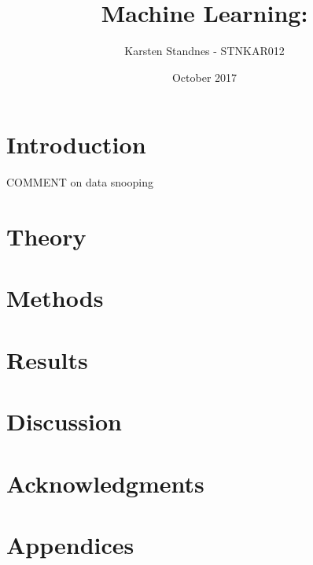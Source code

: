 \documentclass{article}
\title{Machine Learning:  }
\author{Karsten Standnes - STNKAR012}
\date{October 2017}
\begin{document}
	
	\maketitle
	\setlength\parindent{0pt}
	
	\section{Introduction}
	
	
	
	COMMENT on data snooping
	
	\tableofcontents
	\newpage 
	 
	\section{Theory}
	
	
	 
	\section{Methods}
	
	
	
	\section{Results}
	
	
	
	\section{Discussion}
	
	\section{Acknowledgments}
	
	\section{Appendices}
	
	
\end{document}
